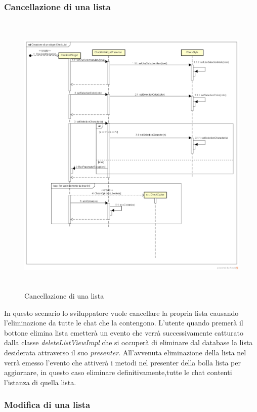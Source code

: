 \subsubsection{Cancellazione di una lista}

\label{Cancellazione di una lista}
\begin{figure}[ht]
	\centering
	\includegraphics[width=16cm, height=14cm]{Sezioni/Diagrammi/img/Creazione di un widget CheckList.png}
	\caption{Cancellazione di una lista}
\end{figure}

In questo scenario lo sviluppatore vuole cancellare la propria lista causando l'eliminazione da tutte le chat che la contengono. L'utente quando premerà il bottone elimina lista emetterà un evento che verrà successivamente catturato dalla classe \textit{deleteListViewImpl} che si occuperà di eliminare dal database la lista desiderata attraverso il suo \textit{presenter}. All'avvenuta eliminazione della lista nel  verrà emesso l'evento che attiverà i metodi nel presenter della bolla lista per aggiornare, in questo caso eliminare definitivamente,tutte le chat contenti l'istanza di quella lista. 

\subsubsection{Modifica di una lista}

